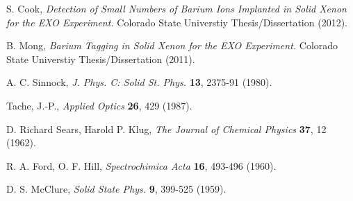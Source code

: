 \documentclass[PhD, copyrightpage]{csuthesis} %
\begin{document}
\begin{thebibliography}{00}
  S. Cook, \emph{Detection of Small Numbers of Barium Ions Implanted in Solid Xenon for the EXO Experiment.}  Colorado State Universtiy Thesis/Dissertation (2012).
 
  B. Mong, \emph{Barium Tagging in Solid Xenon for the EXO Experiment.}  Colorado State Universtiy Thesis/Dissertation (2011).
 
  A. C. Sinnock, \emph{J. Phys. C: Solid St. Phys.} \textbf{13}, 2375-91 (1980).
 
   Tache, J.-P., \emph{Applied Optics} \textbf{26}, 429 (1987).
 
  D. Richard Sears, Harold P. Klug, \emph{The Journal of Chemical Physics} \textbf{37}, 12 (1962).
 
 
  R. A. Ford, O. F. Hill, \emph{Spectrochimica Acta} \textbf{16}, 493-496 (1960).
 
  D. S. McClure, \emph{Solid State Phys.} \textbf{9}, 399-525 (1959).
 \end{thebibliography}
% 
\end{document}
